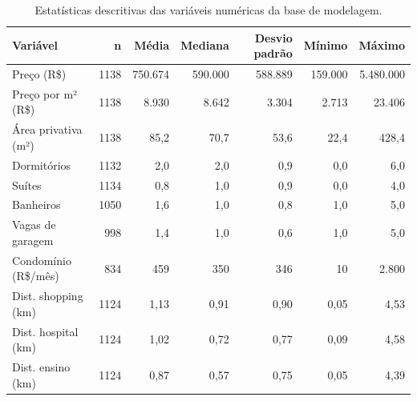 \begin{table}[ht]
\centering
\caption{Estatísticas descritivas das variáveis numéricas da base de modelagem.}
\label{tab:descritiva}
\begin{tabular}{lrrrrrr}
\toprule
\textbf{Variável} & \textbf{n} & \textbf{Média} & \textbf{Mediana} & \textbf{Desvio padrão} & \textbf{Mínimo} & \textbf{Máximo} \\
\midrule
Preço (R\$) & 1138 & 750.674 & 590.000 & 588.889 & 159.000 & 5.480.000 \\
Preço por m² (R\$) & 1138 & 8.930 & 8.642 & 3.304 & 2.713 & 23.406 \\
Área privativa (m²) & 1138 & 85,2 & 70,7 & 53,6 & 22,4 & 428,4 \\
Dormitórios & 1132 & 2,0 & 2,0 & 0,9 & 0,0 & 6,0 \\
Suítes & 1134 & 0,8 & 1,0 & 0,9 & 0,0 & 4,0 \\
Banheiros & 1050 & 1,6 & 1,0 & 0,8 & 1,0 & 5,0 \\
Vagas de garagem & 998 & 1,4 & 1,0 & 0,6 & 1,0 & 5,0 \\
Condomínio (R\$/mês) & 834 & 459 & 350 & 346 & 10 & 2.800 \\
Dist. shopping (km) & 1124 & 1,13 & 0,91 & 0,90 & 0,05 & 4,53 \\
Dist. hospital (km) & 1124 & 1,02 & 0,72 & 0,77 & 0,09 & 4,58 \\
Dist. ensino (km) & 1124 & 0,87 & 0,57 & 0,75 & 0,05 & 4,39 \\
\bottomrule
\end{tabular}
\end{table}
